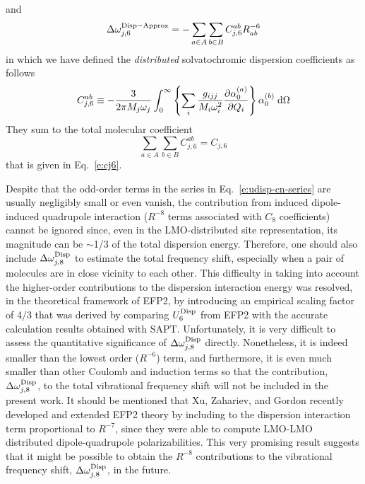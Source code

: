 \documentclass[a4paper,titlepage,twoside,fleqn,12pt]{book}
\begin{document}
\begin{refsection}
%
and 
%
\begin{equation} \label{e:dw-disp-6-iso-approx-distributed}
\Delta \omega_{j,6}^{\rm Disp-Approx} = 
- \sum_{a\in  A}\sum_{b\in B}
C^{ab}_{j,6} R^{-6}_{ab}  
\end{equation}
%
in which we have defined the \emph{distributed} solvatochromic 
dispersion coefficients as follows
%
\begin{equation} \label{e:cj6-distributed}
C^{ab}_{j,6} \equiv -\frac{3}{2\pi M_j\omega_j}
\int_{0}^{\infty} 
\left\{
\sum_i \frac{g_{ijj}}{M_i\omega_i^2} 
\frac{\partial \alpha_0^{(a)}}{\partial Q_i}
\right\}
\alpha_0^{(b)}  \;{\rm d}\Omega  
\end{equation}
%
They sum to the total molecular coefficient
%
\begin{equation}
\sum_{a\in  A}\sum_{b\in B} C^{ab}_{j,6}  =  C_{j,6} 
\end{equation}
%
that is given in Eq.~\eqref{e:cj6}.

Despite that the odd\hyp{}order terms in the series in Eq.~\eqref{e:udisp-cn-series} 
are usually negligibly small or even vanish, the contribution 
from induced dipole\hyp{}induced quadrupole interaction 
($R^{-8}$ terms associated with $C_8$ coefficients) 
cannot be ignored since, even in the LMO\hyp{}distributed 
site representation, its magnitude can be $\sim$1/3 of the total 
dispersion energy.\citep{Adamovic.Gordon.MolPhys.2005} Therefore, one should also include 
$\Delta\omega_{j,8}^{\rm Disp}$ to estimate the total 
frequency shift, especially when a pair of molecules 
are in close vicinity to each other. This difficulty 
in taking into account the higher\hyp{}order contributions 
to the dispersion interaction energy was resolved, in the 
theoretical framework of EFP2, by introducing an empirical 
scaling factor of 4/3 that was derived by comparing 
$U^{\rm Disp}_6$ from EFP2 with the accurate calculation results 
obtained with SAPT.\citep{Jeziorski.Moszynski.Szalewicz.ChemRev.1994,
Adamovic.Gordon.MolPhys.2005} Unfortunately, it is very 
difficult to assess the quantitative significance of 
$\Delta\omega_{j,8}^{\rm Disp}$ directly. Nonetheless, 
it is indeed smaller than the lowest order ($R^{-6}$) term, 
and furthermore, it is even much smaller than other 
Coulomb and induction terms so that the contribution, 
$\Delta\omega_{j,8}^{\rm Disp}$, to the total vibrational 
frequency shift will not be included in the present work. 
It should be mentioned that Xu, Zahariev, and Gordon 
recently developed and extended EFP2 theory by including 
to the dispersion interaction term proportional to $R^{-7}$, 
since they were able to compute LMO\hyp{}LMO distributed 
dipole\hyp{}quadrupole polarizabilities.\citep{Xu.Zahariev.Gordon.JCTC.2014} 
This very promising result suggests that it might be 
possible to obtain the $R^{-8}$ contributions to the 
vibrational frequency shift, $\Delta\omega_{j,8}^{\rm Disp}$, 
in the future.



\end{refsection}
\end{document}
